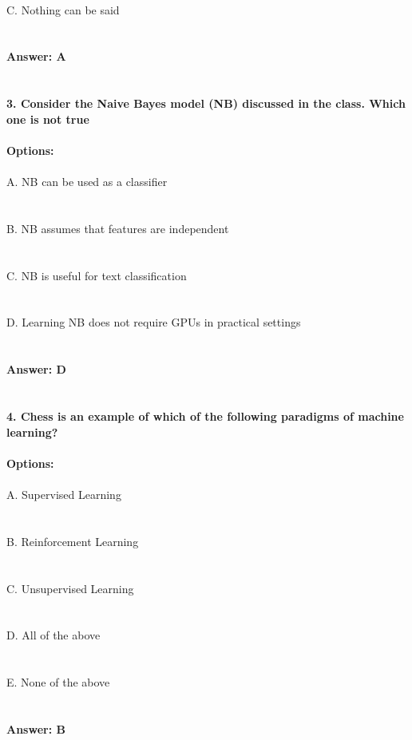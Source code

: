 \documentclass[prl,twocolumn,showpacs,preprintnumbers,superscriptaddress]{revtex4}
\theoremstyle{plain}
\theoremstyle{definition}
\begin{document}
\begin{widetext}
\\
C. Nothing can be said
\\
\\
\\
\textbf{Answer: A}
\\
\\
\\
\noindent\textbf{3. Consider the Naive Bayes model (NB) discussed in the class. Which one is not true}
\\
\\
\textbf{Options:}
\\
\\
\noindent A. NB can be used as a classifier
\\
\\
\\
B. NB assumes that features are independent
\\
\\
\\
C. NB is useful for text classification
\\
\\
\\
D. Learning NB does not require GPUs in practical settings
\\
\\
\\
\textbf{Answer: D}
\\
\\
\\
\noindent\textbf{4. Chess is an example of which of the following paradigms of machine learning?}
\\
\\
\textbf{Options:}
\\
\\
\noindent A. Supervised Learning
\\
\\
\\
B. Reinforcement Learning
\\
\\
\\
C. Unsupervised Learning
\\
\\
\\
D. All of the above
\\
\\
\\
E. None of the above
\\
\\
\\
\textbf{Answer: B}
\\

\end{widetext}
\end{document}
